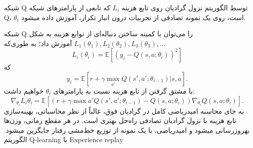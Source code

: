 
 شبکه Q توسط الگوریتم نزول گرادیان روی تابع هزینه 
$L_i$
که تابعی از پارامترهای شبکه 
Q،
$\theta_i$
 است، روی یک نمونه تصادفی از تجربیات درون انبار تکرار، آموزش داده می\nf شود.






شبکه Q را می‌توان با کمینه ساختن دنباله‌ای از توابع هزینه به شکل 
$L_1(\theta_1), L_2(\theta_2), L_3(\theta_3), ... $ آموزش داد؛ به طوری‌که
$$L_i(\theta_i)=\mathbb{E}\left[(y_i - Q(s,a;\theta_i))^2\right]$$  که  $$y_i = \mathbb{E}[r + \gamma \max_{a'} Q(s',a'; \theta_{i-1})| s,a].$$ با مشتق گرفتن از تابع هزینه نسبت به پارامترهای $\theta_i$  خواهیم داشت: $$\nabla_{\theta_i} L_i{\theta_i} = \mathbb{E}\left[ \left(r + \gamma \max{a'} Q(s',a';\theta_{i-1}) - Q(s,a;\theta_i)\right) \nabla_{\theta_i} Q(s,a;\theta_i)\right].$$
به جای محاسبه امیدریاضی کامل در گرادیان فوق، غالباً از نظر محاسباتی، بهینه‌سازی تابع هزینه با نزول گرادیان تصادفی   راه‌حل بهتری است. در هر مقطع زمانی، وزن‌ها به\nf روزرسانی می\nf شود و امیدریاضی، با یک نمونه از توزیع خط‌مشی رفتار  جایگزین می\nf شود.
{الگوریتم Q-learning با Experience replay}

